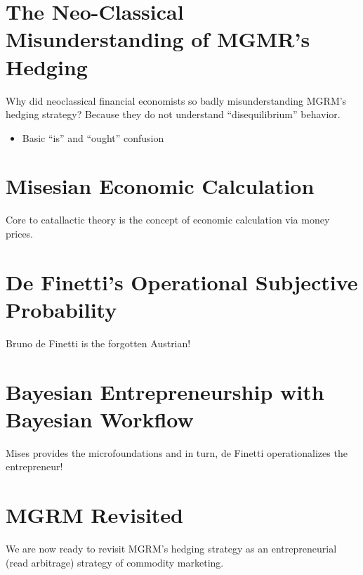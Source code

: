 \documentclass[
  letterpaper,
  DIV=11,
  numbers=noendperiod]{scrartcl}
\providecommand{\tightlist}{%
  \setlength{\itemsep}{0pt}\setlength{\parskip}{0pt}}\usepackage{longtable,booktabs,array}
\begin{document}
\section{The Neo-Classical Misunderstanding of MGMR's
Hedging}\label{the-neo-classical-misunderstanding-of-mgmrs-hedging}

Why did neoclassical financial economists so badly misunderstanding
MGRM's hedging strategy? Because they do not understand
``disequilibrium'' behavior.

\begin{itemize}
\tightlist
\item
  Basic ``is'' and ``ought'' confusion
\end{itemize}

\newpage

\section{Misesian Economic
Calculation}\label{misesian-economic-calculation}

Core to catallactic theory is the concept of economic calculation via
money prices.

\newpage

\section{De Finetti's Operational Subjective
Probability}\label{de-finettis-operational-subjective-probability}

Bruno de Finetti is the forgotten Austrian!

\newpage

\section{Bayesian Entrepreneurship with Bayesian
Workflow}\label{bayesian-entrepreneurship-with-bayesian-workflow}

Mises provides the microfoundations and in turn, de Finetti
operationalizes the entrepreneur!

\newpage

\section{MGRM Revisited}\label{mgrm-revisited}

We are now ready to revisit MGRM's hedging strategy as an
entrepreneurial (read arbitrage) strategy of commodity marketing.
\end{document}
